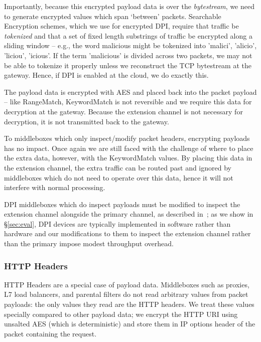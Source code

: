 Importantly, because this encrypted payload data is over the {\it bytestream}, we need to generate encrypted values which span `between' packets. Searchable Encryption schemes, which we use for encrypted DPI, require that traffic be {\it tokenized} and that a set of fixed length substrings of traffic be encrypted along a sliding window -- e.g., the word malicious might be tokenized into {'malici', 'alicio', 'liciou', 'icious'}.
If the term 'malicious' is divided across two packets, we may not be able to tokenize it properly unless we reconstruct the TCP bytestream at the gateway. Hence, if DPI is enabled at the cloud, we do exactly this.

 The payload data is encrypted with AES and placed back into the packet payload -- like RangeMatch, KeywordMatch is not reversible and we require this data for decryption at the gateway.
Because the extension channel is not necessary for decryption, it is not transmitted back to the gateway.

 To middleboxes which only inspect/modify packet headers, encrypting payloads has no impact. Once again we are still faced with the challenge of where to place the extra data, however, with the KeywordMatch values. By placing this data in the extension channel, the extra traffic can be routed past and ignored by middleboxes which do not need to operate over this data, hence it will not interfere with normal processing. 

DPI middleboxes which do inspect payloads must be modified to inspect the extension channel alongside the primary channel, as described in~\cite{blindbox}; as we show in \S\ref{sec:eval}, DPI devices are typically implemented in software rather than hardware and our modifications to them to inspect the extension channel rather than the primary impose modest throughput overhead. 

\subsubsection{HTTP Headers} 

HTTP Headers are a special case of payload data.
Middleboxes such as proxies, L7 load balancers, and parental filters do not read arbitrary values from packet payloads: the only values they read are the HTTP headers.
We treat these values specially compared to other payload data; we encrypt the HTTP URI using unsalted AES (which is deterministic) and store them in IP options header of the packet containing the request.

